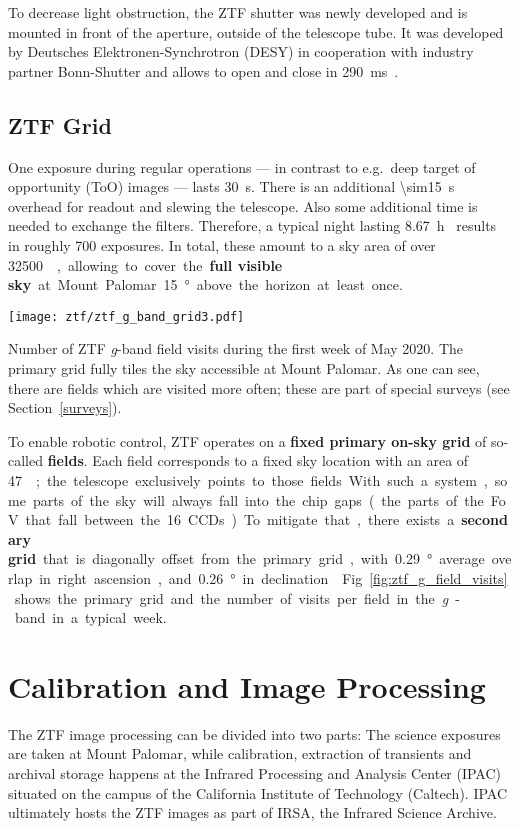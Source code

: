 To decrease light obstruction, the ZTF shutter was newly developed and is mounted in front of the aperture, outside of the telescope tube. It was developed by Deutsches Elektronen-Synchrotron (DESY) in cooperation with industry partner Bonn-Shutter and allows to open and close in \SI{290}{\milli\second}~\cite{Dekany2020}.

\subsection{ZTF Grid}\label{ztf_grid}
One exposure during regular operations --- in contrast to e.g.\ deep target of opportunity (ToO) images --- lasts \SI{30}{\second}. There is an additional \SI{\sim15}{\second} overhead for readout and slewing the telescope. Also some additional time is needed to exchange the filters. Therefore, a typical night lasting \SI{8.67}{\hour}~ results in roughly 700 exposures. In total, these amount to a sky area of over \SI{32500}{\square\deg}, allowing to cover the \textbf{full visible sky} at Mount Palomar \SI{15}{\degree} above the horizon at least once.

\begin{marginfigure}
    \texttt{[image: ztf/ztf\_g\_band\_grid3.pdf]}
    \caption[ZTF field visits]{Number of ZTF \textit{g}-band field visits during the first week of May 2020. The primary grid fully tiles the sky accessible at Mount Palomar. As one can see, there are fields which are visited more often; these are part of special surveys (see Section~\ref{surveys}).}
\end{marginfigure}

To enable robotic control, ZTF operates on a \textbf{fixed primary on-sky grid} of so-called \textbf{fields}. Each field corresponds to a fixed sky location with an area of \SI{47}{\square\deg}; the telescope exclusively points to those fields. With such a system, some parts of the sky will always fall into the chip gaps (the parts of the FoV that fall between the 16 CCDs). To mitigate that, there exists a \textbf{secondary grid} that is diagonally offset from the primary grid, with \SI{0.29}{\degree} average overlap in right ascension, and \SI{0.26}{\degree} in declination~. Fig.~\ref{fig:ztf_g_field_visits} shows the primary grid and the number of visits per field in the \textit{g}-band in a typical week.

\section{Calibration and Image Processing}
The ZTF image processing can be divided into two parts: The science exposures are taken at Mount Palomar, while calibration, extraction of transients and archival storage happens at the Infrared Processing and Analysis Center (IPAC) situated on the campus of the California Institute of Technology (Caltech). IPAC ultimately hosts the ZTF images as part of IRSA, the Infrared Science Archive.

